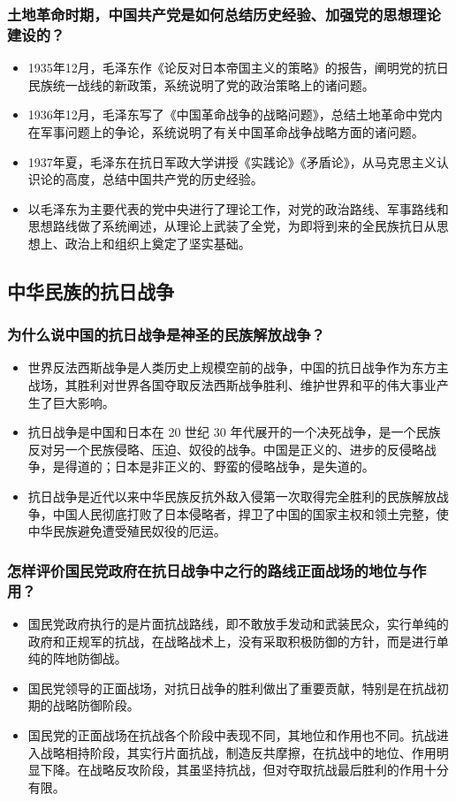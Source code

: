 \documentclass{article}
\begin{document}
\subsubsection{土地革命时期，中国共产党是如何总结历史经验、加强党的思想理论建设的？}
\begin{itemize}
    \item 1935年12月，毛泽东作《论反对日本帝国主义的策略》的报告，阐明党的抗日民族统一战线的新政策，系统说明了党的政治策略上的诸问题。
    \item 1936年12月，毛泽东写了《中国革命战争的战略问题》，总结土地革命中党内在军事问题上的争论，系统说明了有关中国革命战争战略方面的诸问题。
    \item 1937年夏，毛泽东在抗日军政大学讲授《实践论》《矛盾论》，从马克思主义认识论的高度，总结中国共产党的历史经验。
    \item 以毛泽东为主要代表的党中央进行了理论工作，对党的政治路线、军事路线和思想路线做了系统阐述，从理论上武装了全党，为即将到来的全民族抗日从思想上、政治上和组织上奠定了坚实基础。
\end{itemize}

\subsection{中华民族的抗日战争}

\subsubsection{为什么说中国的抗日战争是神圣的民族解放战争？}
\begin{itemize}
    \item 世界反法西斯战争是人类历史上规模空前的战争，中国的抗日战争作为东方主战场，其胜利对世界各国夺取反法西斯战争胜利、维护世界和平的伟大事业产生了巨大影响。
    \item 抗日战争是中国和日本在 20 世纪 30 年代展开的一个决死战争，是一个民族反对另一个民族侵略、压迫、奴役的战争。中国是正义的、进步的反侵略战争，是得道的；日本是非正义的、野蛮的侵略战争，是失道的。
    \item 抗日战争是近代以来中华民族反抗外敌入侵第一次取得完全胜利的民族解放战争，中国人民彻底打败了日本侵略者，捍卫了中国的国家主权和领土完整，使中华民族避免遭受殖民奴役的厄运。
\end{itemize}

\subsubsection{怎样评价国民党政府在抗日战争中之行的路线正面战场的地位与作用？}
\begin{itemize}
    \item 国民党政府执行的是片面抗战路线，即不敢放手发动和武装民众，实行单纯的政府和正规军的抗战，在战略战术上，没有采取积极防御的方针，而是进行单纯的阵地防御战。
    \item 国民党领导的正面战场，对抗日战争的胜利做出了重要贡献，特别是在抗战初期的战略防御阶段。
    \item 国民党的正面战场在抗战各个阶段中表现不同，其地位和作用也不同。抗战进入战略相持阶段，其实行片面抗战，制造反共摩擦，在抗战中的地位、作用明显下降。在战略反攻阶段，其虽坚持抗战，但对夺取抗战最后胜利的作用十分有限。
\end{itemize}
\end{document}
